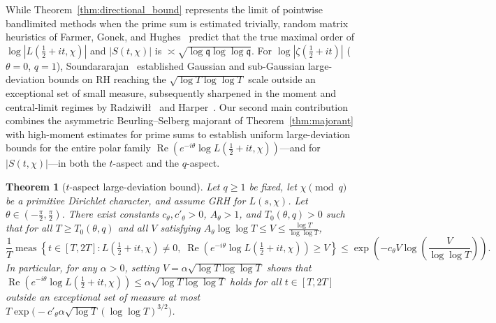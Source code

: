 \documentclass[11pt,a4paper]{amsart}
\newtheorem{theorem}{Theorem}[section]
\theoremstyle{remark}
\numberwithin{equation}{section}
\newcommand{\q}{\mathfrak{q}}
\DeclareMathOperator{\meas}{meas}
\begin{document}
While Theorem~\ref{thm:directional_bound} represents the limit of pointwise bandlimited methods when the prime sum is estimated trivially, random matrix heuristics of Farmer, Gonek, and Hughes~\cite{FGH2007} predict that the true maximal order of $\log|L(\frac{1}{2}+it,\chi)|$ and $|S(t,\chi)|$ is $\asymp \sqrt{\log\q\log\log\q}$. For $\log|\zeta(\frac{1}{2}+it)|$ ($\theta = 0$, $q = 1$), Soundararajan~\cite{Soundararajan2009} established Gaussian and sub-Gaussian large-deviation bounds on RH reaching the $\sqrt{\log T\log\log T}$ scale outside an exceptional set of small measure, subsequently sharpened in the moment and central-limit regimes by Radziwi\l\l{}~\cite{Radziwill2011} and Harper~\cite{Harper2013}. Our second main contribution combines the asymmetric Beurling--Selberg majorant of Theorem~\ref{thm:majorant} with high-moment estimates for prime sums to establish uniform large-deviation bounds for the entire polar family $\operatorname{Re}(e^{-i\theta}\log L(\frac{1}{2}+it,\chi))$---and for $|S(t,\chi)|$---in both the $t$-aspect and the $q$-aspect.

\begin{theorem}[$t$-aspect large-deviation bound]\label{thm:t_large_dev}
Let $q \ge 1$ be fixed, let $\chi \pmod q$ be a primitive Dirichlet character, and assume GRH for $L(s,\chi)$. Let $\theta \in (-\frac{\pi}{2},\frac{\pi}{2})$. There exist constants $c_\theta, c'_\theta > 0$, $A_\theta > 1$, and $T_0(\theta,q) > 0$ such that for all $T \ge T_0(\theta,q)$ and all $V$ satisfying $A_\theta\log\log T \le V \le \frac{\log T}{\log\log T}$,
\[
  \frac{1}{T}\meas\left\{t \in [T,2T] : L(\tfrac{1}{2}+it,\chi) \neq 0,\; \operatorname{Re}\!\left(e^{-i\theta}\log L(\tfrac{1}{2}+it,\chi)\right) \ge V\right\}
  \le \exp\!\left(-c_\theta V\log\!\left(\frac{V}{\log\log T}\right)\right).
\]
In particular, for any $\alpha > 0$, setting $V = \alpha\sqrt{\log T\log\log T}$ shows that $\operatorname{Re}(e^{-i\theta}\log L(\frac{1}{2}+it,\chi)) \le \alpha\sqrt{\log T\log\log T}$ holds for all $t \in [T,2T]$ outside an exceptional set of measure at most $T\exp\bigl(-c'_\theta \alpha\sqrt{\log T}(\log\log T)^{3/2}\bigr)$.
\end{theorem}
\end{document}
